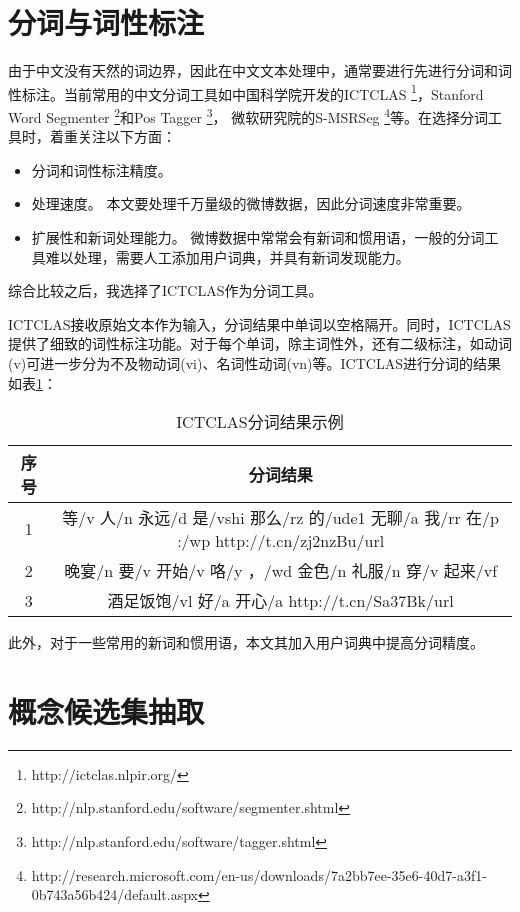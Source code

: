 \section{分词与词性标注}

由于中文没有天然的词边界，因此在中文文本处理中，通常要进行先进行分词和词性标注。当前常用的中文分词工具如中国科学院开发的ICTCLAS \footnote{http://ictclas.nlpir.org/}，Stanford Word Segmenter \footnote{http://nlp.stanford.edu/software/segmenter.shtml}和Pos Tagger \footnote{http://nlp.stanford.edu/software/tagger.shtml}， 微软研究院的S-MSRSeg \footnote{http://research.microsoft.com/en-us/downloads/7a2bb7ee-35e6-40d7-a3f1-0b743a56b424/default.aspx}等。在选择分词工具时，着重关注以下方面：
\begin{itemize}
\item 分词和词性标注精度。
\item 处理速度。 本文要处理千万量级的微博数据，因此分词速度非常重要。
\item 扩展性和新词处理能力。 微博数据中常常会有新词和惯用语，一般的分词工具难以处理，需要人工添加用户词典，并具有新词发现能力。
\end{itemize}
综合比较之后，我选择了ICTCLAS作为分词工具。

ICTCLAS接收原始文本作为输入，分词结果中单词以空格隔开。同时，ICTCLAS提供了细致的词性标注功能。对于每个单词，除主词性外，还有二级标注，如动词(v)可进一步分为不及物动词(vi)、名词性动词(vn)等。ICTCLAS进行分词的结果如表\ref{table:ictclas_result}：

\begin{table}[!h]
\kaishu
\centering
\begin{tabular}{|c|c|}
\hline
序号 & 分词结果 \\
\hline
1 & 等/v 人/n 永远/d 是/vshi 那么/rz 的/ude1 无聊/a   我/rr 在/p :/wp http://t.cn/zj2nzBu/url \\
\hline
2 & 晚宴/n 要/v 开始/v 咯/y ，/wd 金色/n 礼服/n 穿/v 起来/vf \\
\hline
3 & 酒足饭饱/vl 好/a 开心/a   http://t.cn/Sa37Bk/url \\
\hline
\end{tabular}
\caption{ICTCLAS分词结果示例}
\label{table:ictclas_result}
\end{table}

此外，对于一些常用的新词和惯用语，本文其加入用户词典中提高分词精度。

\section{概念候选集抽取}
\label{sec:phrase_extraction}

